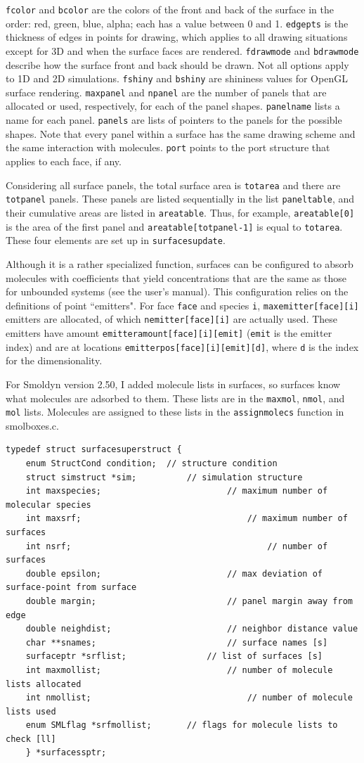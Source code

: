 \documentclass {scrbook}
\newcommand {\ttt} {\texttt}
\begin{document}
\ttt{fcolor} and \ttt{bcolor} are the colors of the front and back of the surface in the order: red, green, blue, alpha; each has a value between 0 and 1. \ttt{edgepts} is the thickness of edges in points for drawing, which applies to all drawing situations except for 3D and when the surface faces are rendered. \ttt{fdrawmode} and \ttt{bdrawmode} describe how the surface front and back should be drawn. Not all options apply to 1D and 2D simulations. \ttt{fshiny} and \ttt{bshiny} are shininess values for OpenGL surface rendering. \ttt{maxpanel} and \ttt{npanel} are the number of panels that are allocated or used, respectively, for each of the panel shapes. \ttt{panelname} lists a name for each panel. \ttt{panels} are lists of pointers to the panels for the possible shapes. Note that every panel within a surface has the same drawing scheme and the same interaction with molecules. \ttt{port} points to the port structure that applies to each face, if any.

Considering all surface panels, the total surface area is \ttt{totarea} and there are \ttt{totpanel} panels. These panels are listed sequentially in the list \ttt{paneltable}, and their cumulative areas are listed in \ttt{areatable}. Thus, for example, \ttt{areatable[0]} is the area of the first panel and \ttt{areatable[totpanel-1]} is equal to \ttt{totarea}. These four elements are set up in \ttt{surfacesupdate}.

Although it is a rather specialized function, surfaces can be configured to absorb molecules with coefficients that yield concentrations that are the same as those for unbounded systems (see the user's manual). This configuration relies on the definitions of point ``emitters". For face \ttt{face} and species \ttt{i}, \ttt{maxemitter[face][i]} emitters are allocated, of which \ttt{nemitter[face][i]} are actually used. These emitters have amount \ttt{emitteramount[face][i][emit]} (\ttt{emit} is the emitter index) and are at locations \ttt{emitterpos[face][i][emit][d]}, where \ttt{d} is the index for the dimensionality.

For Smoldyn version 2.50, I added molecule lists in surfaces, so surfaces know what molecules are adsorbed to them. These lists are in the \ttt{maxmol}, \ttt{nmol}, and \ttt{mol} lists. Molecules are assigned to these lists in the \ttt{assignmolecs} function in smolboxes.c.

\begin{lstlisting}
typedef struct surfacesuperstruct {
	enum StructCond condition;	// structure condition
	struct simstruct *sim;			// simulation structure
	int maxspecies;							// maximum number of molecular species
	int maxsrf;									// maximum number of surfaces
	int nsrf;										// number of surfaces
	double epsilon;							// max deviation of surface-point from surface
	double margin;							// panel margin away from edge
	double neighdist;						// neighbor distance value
	char **snames;							// surface names [s]
	surfaceptr *srflist;				// list of surfaces [s]
	int maxmollist;							// number of molecule lists allocated
	int nmollist;								// number of molecule lists used
	enum SMLflag *srfmollist;		// flags for molecule lists to check [ll]
	} *surfacessptr;
\end{lstlisting}
\end{document}
